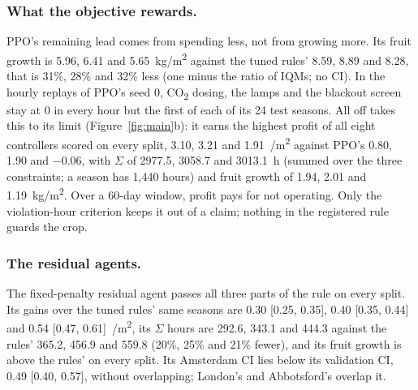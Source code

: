\documentclass[letterpaper]{article} %
\newcommand{\cotwo}{CO\textsubscript{2}}
\newcommand{\eurm}{\texteuro/m\textsuperscript{2}}
\newcommand{\kgm}{kg/m\textsuperscript{2}}
\begin{document}
\subsubsection{What the objective rewards.}
PPO's remaining lead comes from spending less, not from growing more. Its fruit growth is 5.96, 6.41 and 5.65~\kgm{} against the tuned rules' 8.59, 8.89 and 8.28, that is 31\%, 28\% and 32\% less (one minus the ratio of IQMs; no CI).
In the hourly replays of PPO's seed 0, \cotwo{} dosing, the lamps and the blackout screen stay at 0 in every hour but the first of each of its 24 test seasons.
All off takes this to its limit (Figure~\ref{fig:main}b): it earns the highest profit of all eight controllers scored on every split, 3.10, 3.21 and 1.91~\eurm{} against PPO's 0.80, 1.90 and $-0.06$, with $\Sigma$ of 2977.5, 3058.7 and 3013.1~h (summed over the three constraints; a season has 1,440 hours) and fruit growth of 1.94, 2.01 and 1.19~\kgm{}. Over a 60-day window, profit pays for not operating. Only the violation-hour criterion keeps it out of a claim; nothing in the registered rule guards the crop.

\subsubsection{The residual agents.}
The fixed-penalty residual agent passes all three parts of the rule on every split. Its gains over the tuned rules' same seasons are 0.30 [0.25, 0.35], 0.40 [0.35, 0.44] and 0.54 [0.47, 0.61]~\eurm{}, its $\Sigma$ hours are 292.6, 343.1 and 444.3 against the rules' 365.2, 456.9 and 559.8 (20\%, 25\% and 21\% fewer), and its fruit growth is above the rules' on every split.
Its Amsterdam CI lies below its validation CI, 0.49 [0.40, 0.57], without overlapping; London's and Abbotsford's overlap it.
\end{document}
